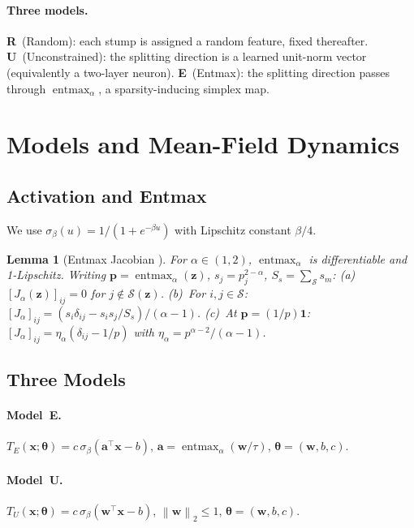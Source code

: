 \documentclass[11pt,a4paper]{article}
\newtheorem{lemma}[theorem]{Lemma}
\theoremstyle{definition}
\theoremstyle{remark}
\newcommand{\cS}{\mathcal{S}}
\newcommand{\vtheta}{\boldsymbol{\theta}}
\newcommand{\vw}{\mathbf{w}}
\newcommand{\vx}{\mathbf{x}}
\newcommand{\va}{\mathbf{a}}
\newcommand{\vone}{\mathbf{1}}
\newcommand{\vz}{\mathbf{z}}
\newcommand{\entmax}{\operatorname{entmax}}
\newcommand{\norm}[1]{\left\|#1\right\|}
\begin{document}
\paragraph{Three models.}
\textbf{R}~(Random): each stump is assigned a
random feature, fixed thereafter.
\textbf{U}~(Unconstrained): the splitting
direction is a learned unit-norm vector
(equivalently a two-layer neuron).
\textbf{E}~(Entmax): the splitting direction
passes through $\entmax_\alpha$, a
sparsity-inducing simplex map.


\section{Models and Mean-Field Dynamics}
\label{sec:setup}

\subsection{Activation and Entmax}

We use $\sigma_\beta(u) = 1/(1+e^{-\beta u})$
with Lipschitz constant $\beta/4$.

\begin{lemma}[Entmax Jacobian
  {\citep{blondel2020learning}}]
  \label{lem:entmax}
  For $\alpha \in (1,2)$,
  $\entmax_\alpha$ is differentiable and
  1-Lipschitz.
  Writing $\mathbf{p} = \entmax_\alpha(\vz)$,
  $s_j = p_j^{2-\alpha}$,
  $S_s = \sum_{\cS} s_m$:
  (a)~$[J_\alpha(\vz)]_{ij} = 0$ for
  $j \notin \cS(\vz)$.
  (b)~For $i,j \in \cS$:
  $[J_\alpha]_{ij}
  = (s_i\delta_{ij} - s_is_j/S_s)/(\alpha{-}1)$.
  (c)~At $\mathbf{p} = (1/p)\vone$:
  $[J_\alpha]_{ij}
  = \eta_\alpha(\delta_{ij} - 1/p)$
  with
  $\eta_\alpha = p^{\alpha-2}/(\alpha{-}1)$.
\end{lemma}


\subsection{Three Models}

\paragraph{Model~E.}
$T_E(\vx;\vtheta)
= c\,\sigma_\beta(\va^\top\vx - b)$,
$\va = \entmax_\alpha(\vw/\tau)$,
$\vtheta = (\vw,b,c)$.

\paragraph{Model~U.}
$T_U(\vx;\vtheta)
= c\,\sigma_\beta(\vw^\top\vx - b)$,
$\norm{\vw}_2 \le 1$,
$\vtheta = (\vw,b,c)$.
\end{document}
